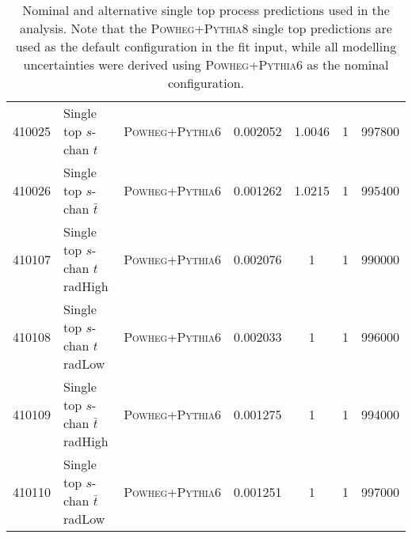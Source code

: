 \begin{table}[hb]
{\begin{tabular}{rllS[table-format=10.9]S[table-format=10.9]rr}
      410025 & Single top $s$-chan $t$ & \textsc{Powheg}+\textsc{Pythia}6 & 0.002052 & 1.0046 & 1 &  997800\\
      410026 & Single top $s$-chan $\bar{t}$ & \textsc{Powheg}+\textsc{Pythia}6 & 0.001262 & 1.0215 & 1 &  995400\\
      410107 & Single top $s$-chan $t$ radHigh  & \textsc{Powheg}+\textsc{Pythia}6 & 0.002076 & 1 & 1 & 990000\\
      410108 & Single top $s$-chan $t$ radLow  & \textsc{Powheg}+\textsc{Pythia}6 & 0.002033 & 1 & 1 & 996000\\
      410109 & Single top $s$-chan $\bar{t}$ radHigh & \textsc{Powheg}+\textsc{Pythia}6  & 0.001275 & 1 & 1 & 994000\\
      410110 & Single top $s$-chan $\bar{t}$ radLow  & \textsc{Powheg}+\textsc{Pythia}6 & 0.001251 & 1 & 1 & 997000\\
      \bottomrule
  \end{tabular}
  }
  \caption[Nominal and alternative single top samples.]{Nominal and alternative
    single top process predictions used in the analysis. Note that the
    \textsc{Powheg}+\textsc{Pythia}8 single top predictions are used as the
    default configuration in the fit input, while all modelling uncertainties
    were derived using \textsc{Powheg}+\textsc{Pythia}6 as the nominal
    configuration.}
  \label{tab:st-nom-alt}
\end{table}